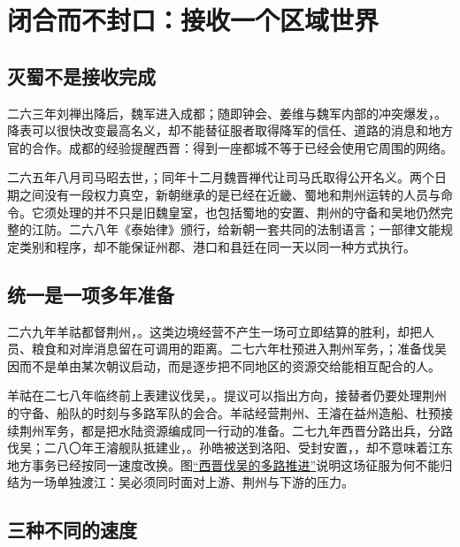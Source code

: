 \section{闭合而不封口：接收一个区域世界}
\label{sec:jin-unification}

\subsection{灭蜀不是接收完成}

二六三年刘禅出降后，魏军进入成都；随即钟会、姜维与魏军内部的冲突爆发，。降表可以很快改变最高名义，却不能替征服者取得降军的信任、道路的消息和地方官的合作。成都的经验提醒西晋：得到一座都城不等于已经会使用它周围的网络。

二六五年八月司马昭去世，；同年十二月魏晋禅代让司马氏取得公开名义。两个日期之间没有一段权力真空，新朝继承的是已经在近畿、蜀地和荆州运转的人员与命令。它须处理的并不只是旧魏皇室，也包括蜀地的安置、荆州的守备和吴地仍然完整的江防。二六八年《泰始律》颁行，给新朝一套共同的法制语言；一部律文能规定类别和程序，却不能保证州郡、港口和县廷在同一天以同一种方式执行。

\subsection{统一是一项多年准备}

二六九年羊祜都督荆州，。这类边境经营不产生一场可立即结算的胜利，却把人员、粮食和对岸消息留在可调用的距离。二七六年杜预进入荆州军务，；准备伐吴因而不是单由某次朝议启动，而是逐步把不同地区的资源交给能相互配合的人。

羊祜在二七八年临终前上表建议伐吴，。提议可以指出方向，接替者仍要处理荆州的守备、船队的时刻与多路军队的会合。羊祜经营荆州、王濬在益州造船、杜预接续荆州军务，都是把水陆资源编成同一行动的准备。二七九年西晋分路出兵，分路伐吴；二八〇年王濬舰队抵建业，。孙皓被送到洛阳、受封安置，，却不意味着江东地方事务已经按同一速度改换。图\hyperref[fig:vol02b:jin-conquest-wu]{“西晋伐吴的多路推进”}说明这场征服为何不能归结为一场单独渡江：吴必须同时面对上游、荆州与下游的压力。

\subsection{三种不同的速度}

